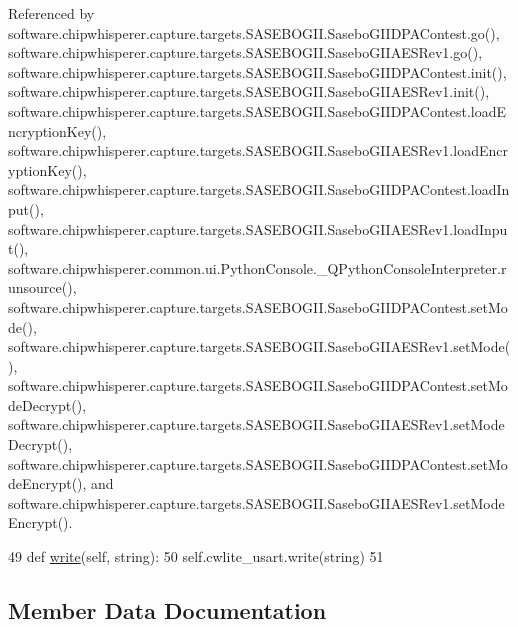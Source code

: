 Referenced by software.\+chipwhisperer.\+capture.\+targets.\+S\+A\+S\+E\+B\+O\+G\+I\+I.\+Sasebo\+G\+I\+I\+D\+P\+A\+Contest.\+go(), software.\+chipwhisperer.\+capture.\+targets.\+S\+A\+S\+E\+B\+O\+G\+I\+I.\+Sasebo\+G\+I\+I\+A\+E\+S\+Rev1.\+go(), software.\+chipwhisperer.\+capture.\+targets.\+S\+A\+S\+E\+B\+O\+G\+I\+I.\+Sasebo\+G\+I\+I\+D\+P\+A\+Contest.\+init(), software.\+chipwhisperer.\+capture.\+targets.\+S\+A\+S\+E\+B\+O\+G\+I\+I.\+Sasebo\+G\+I\+I\+A\+E\+S\+Rev1.\+init(), software.\+chipwhisperer.\+capture.\+targets.\+S\+A\+S\+E\+B\+O\+G\+I\+I.\+Sasebo\+G\+I\+I\+D\+P\+A\+Contest.\+load\+Encryption\+Key(), software.\+chipwhisperer.\+capture.\+targets.\+S\+A\+S\+E\+B\+O\+G\+I\+I.\+Sasebo\+G\+I\+I\+A\+E\+S\+Rev1.\+load\+Encryption\+Key(), software.\+chipwhisperer.\+capture.\+targets.\+S\+A\+S\+E\+B\+O\+G\+I\+I.\+Sasebo\+G\+I\+I\+D\+P\+A\+Contest.\+load\+Input(), software.\+chipwhisperer.\+capture.\+targets.\+S\+A\+S\+E\+B\+O\+G\+I\+I.\+Sasebo\+G\+I\+I\+A\+E\+S\+Rev1.\+load\+Input(), software.\+chipwhisperer.\+common.\+ui.\+Python\+Console.\+\_\+\+Q\+Python\+Console\+Interpreter.\+runsource(), software.\+chipwhisperer.\+capture.\+targets.\+S\+A\+S\+E\+B\+O\+G\+I\+I.\+Sasebo\+G\+I\+I\+D\+P\+A\+Contest.\+set\+Mode(), software.\+chipwhisperer.\+capture.\+targets.\+S\+A\+S\+E\+B\+O\+G\+I\+I.\+Sasebo\+G\+I\+I\+A\+E\+S\+Rev1.\+set\+Mode(), software.\+chipwhisperer.\+capture.\+targets.\+S\+A\+S\+E\+B\+O\+G\+I\+I.\+Sasebo\+G\+I\+I\+D\+P\+A\+Contest.\+set\+Mode\+Decrypt(), software.\+chipwhisperer.\+capture.\+targets.\+S\+A\+S\+E\+B\+O\+G\+I\+I.\+Sasebo\+G\+I\+I\+A\+E\+S\+Rev1.\+set\+Mode\+Decrypt(), software.\+chipwhisperer.\+capture.\+targets.\+S\+A\+S\+E\+B\+O\+G\+I\+I.\+Sasebo\+G\+I\+I\+D\+P\+A\+Contest.\+set\+Mode\+Encrypt(), and software.\+chipwhisperer.\+capture.\+targets.\+S\+A\+S\+E\+B\+O\+G\+I\+I.\+Sasebo\+G\+I\+I\+A\+E\+S\+Rev1.\+set\+Mode\+Encrypt().


\begin{DoxyCode}
49     \textcolor{keyword}{def }\hyperlink{classsoftware_1_1chipwhisperer_1_1capture_1_1targets_1_1simpleserial__readers_1_1cwlite_1_1SimpleSerial__ChipWhispererLite_ab93c0a0e2f0fdcdf4bcfdb727cf8738d}{write}(self, string):
50         self.cwlite\_usart.write(string)
51 
\end{DoxyCode}


\subsection{Member Data Documentation}
\hypertarget{classsoftware_1_1chipwhisperer_1_1capture_1_1targets_1_1simpleserial__readers_1_1cwlite_1_1SimpleSerial__ChipWhispererLite_a9c2060c999bfecfbd635ce557c764293}{}
